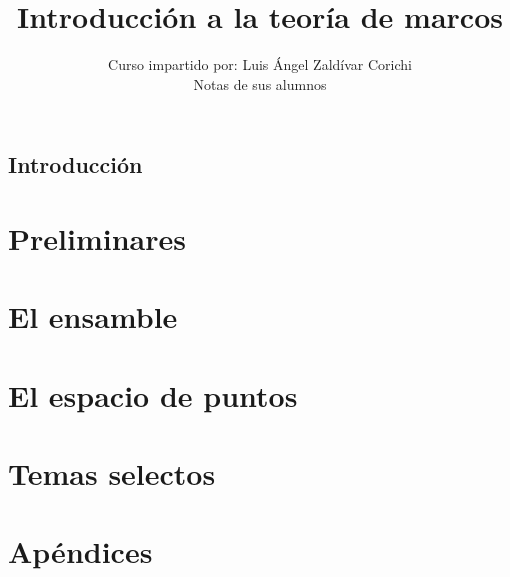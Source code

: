 \documentclass[12pt,letterpaper,titlepage,draft]{book}
\title{Introducción a la teoría de marcos}
\author{Curso impartido por: Luis Ángel Zaldívar Corichi \\
\small{Notas de sus alumnos}}
\theoremstyle{definition}
\newcommand\<{\langle}
\renewcommand\>{\rangle}
\begin{document}
\maketitle

\chapter*{Introducción}


\tableofcontents

\part{Preliminares}






\part{El ensamble} \label{part:ensamble}





\part{El espacio de puntos} \label{part:espacio-de-puntos}






\part{Temas selectos}








\part{Apéndices}



\printbibliography
\end{document}
